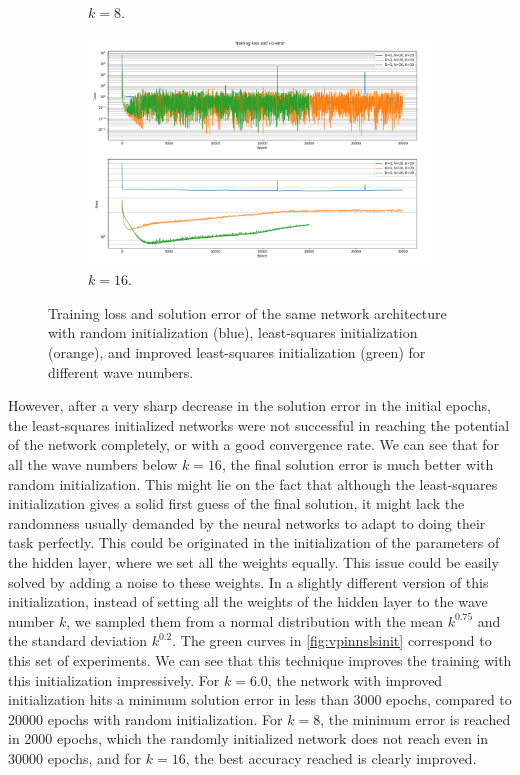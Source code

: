 \begin{figure}[h!]
\begin{subfigure}[b]{0.48\textwidth}
        \caption{$k=8$.}
        \label{fig:vpinnslsinitk8}
    \end{subfigure}
    \hfill
    \begin{subfigure}[b]{0.48\textwidth}
        \includegraphics[width=\textwidth]{img/VPINN-Comparison-lsinitk16.png}
        \caption{$k=16$.}
        \label{fig:vpinnslsinitk16}
    \end{subfigure}
    \caption{Training loss and solution error of the same network architecture with random initialization (blue), least-squares initialization (orange), and improved least-squares initialization (green) for different wave numbers.}
    \label{fig:vpinnslsinit}
\end{figure}

However, after a very sharp decrease in the solution error in the initial epochs, the least-squares initialized networks were not successful in reaching the potential of the network completely, or with a good convergence rate. We can see that for all the wave numbers below $k=16$, the final solution error is much better with random initialization. This might lie on the fact that although the least-squares initialization gives a solid first guess of the final solution, it might lack the randomness usually demanded by the neural networks to adapt to doing their task perfectly. This could be originated in the initialization of the parameters of the hidden layer, where we set all the weights equally. This issue could be easily solved by adding a noise to these weights. In a slightly different version of this initialization, instead of setting all the weights of the hidden layer to the wave number $k$, we sampled them from a normal distribution with the mean $k^{0.75}$ and the standard deviation $k^{0.2}$. The green curves in \autoref{fig:vpinnslsinit} correspond to this set of experiments. We can see that this technique improves the training with this initialization impressively. For $k=6.0$, the network with improved initialization hits a minimum solution error in less than 3000 epochs, compared to 20000 epochs with random initialization. For $k=8$, the minimum error is reached in 2000 epochs, which the randomly initialized network does not reach even in 30000 epochs, and for $k=16$, the best accuracy reached is clearly improved.

